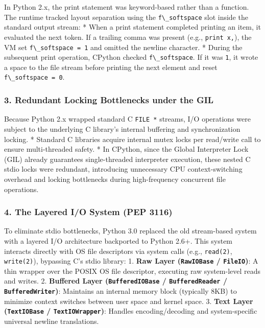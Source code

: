 In Python 2.x, the print statement was keyword-based rather than a
function. The runtime tracked layout separation using the
\passthrough{\lstinline!f\_softspace!} slot inside the standard output
stream: * When a print statement completed printing an item, it
evaluated the next token. If a trailing comma was present (e.g.,
\passthrough{\lstinline!print x,!}), the VM set
\passthrough{\lstinline!f\_softspace = 1!} and omitted the newline
character. * During the subsequent print operation, CPython checked
\passthrough{\lstinline!f\_softspace!}. If it was
\passthrough{\lstinline!1!}, it wrote a space to the file stream before
printing the next element and reset
\passthrough{\lstinline!f\_softspace = 0!}.

\hypertarget{redundant-locking-bottlenecks-under-the-gil}{%
\subsubsection{3. Redundant Locking Bottlenecks under the
GIL}\label{redundant-locking-bottlenecks-under-the-gil}}

Because Python 2.x wrapped standard C \passthrough{\lstinline!FILE *!}
streams, I/O operations were subject to the underlying C library's
internal buffering and synchronization locking. * Standard C libraries
acquire internal mutex locks per read/write call to ensure
multi-threaded safety. * In CPython, since the Global Interpreter Lock
(GIL) already guarantees single-threaded interpreter execution, these
nested C stdio locks were redundant, introducing unnecessary CPU
context-switching overhead and locking bottlenecks during high-frequency
concurrent file operations.

\hypertarget{the-layered-io-system-pep-3116}{%
\subsubsection{4. The Layered I/O System (PEP
3116)}\label{the-layered-io-system-pep-3116}}

To eliminate stdio bottlenecks, Python 3.0 replaced the old stream-based
system with a layered I/O architecture backported to Python 2.6+. This
system interacts directly with OS file descriptors via system calls
(e.g., \passthrough{\lstinline!read(2)!},
\passthrough{\lstinline!write(2)!}), bypassing C's stdio library: 1.
\textbf{Raw Layer (\passthrough{\lstinline!RawIOBase!} /
\passthrough{\lstinline!FileIO!})}: A thin wrapper over the POSIX OS
file descriptor, executing raw system-level reads and writes. 2.
\textbf{Buffered Layer (\passthrough{\lstinline!BufferedIOBase!} /
\passthrough{\lstinline!BufferedReader!} /
\passthrough{\lstinline!BufferedWriter!})}: Maintains an internal memory
block (typically 8KB) to minimize context switches between user space
and kernel space. 3. \textbf{Text Layer
(\passthrough{\lstinline!TextIOBase!} /
\passthrough{\lstinline!TextIOWrapper!})}: Handles encoding/decoding and
system-specific universal newline translations.

